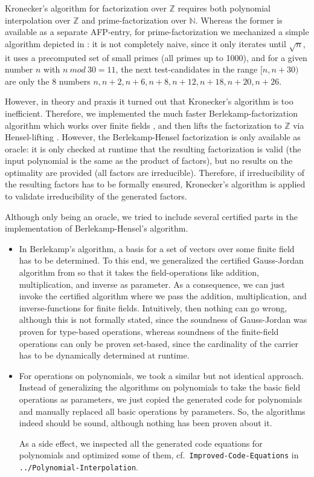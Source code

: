 \documentclass[11pt,a4paper]{article}
\newcommand\ints{\mathbb{Z}}
\newcommand\nats{\mathbb{N}}
\newcommand\mod{\mathit{mod}}
\begin{document}
Kronecker's algorithm for factorization over $\ints$ requires both
polynomial interpolation over $\ints$ and prime-factorization over $\nats$. Whereas the former
is available as a separate AFP-entry, for prime-factorization we mechanized a simple algorithm depicted
in \cite{Knuth}: it is not completely naive, since it only iterates until $\sqrt n$, it uses
a precomputed set of small primes (all primes up to 1000), 
and for a given number $n$ with $n\ \mod\ 30 = 11$, 
the next test-candidates in the range $[n,n+30)$ 
are only the 8 numbers $n,n+2,n+6,n+8,n+12,n+18,n+20,n+26$.

However, in theory and praxis it turned out that Kronecker's algorithm is too inefficient. 
Therefore, we implemented the much faster Berlekamp-factorization algorithm which works over finite fields \cite{Berlekamp}, and
then lifts the factorization to $\ints$ via Hensel-lifting \cite{Hensel}. However, the Berlekamp-Hensel
factorization is only available as oracle: it is only checked at runtime that the resulting
factorization is valid (the input polynomial is the same as the product of factors), 
but no results on the optimality are provided (all factors are irreducible). 
Therefore, if irreducibility of the resulting factors has to be formally ensured, 
Kronecker's algorithm is applied to validate irreducibility of the generated factors.

Although only being an oracle, we tried to include several certified parts in the implementation
of Berlekamp-Hensel's algorithm.
\begin{itemize}
\item In Berlekamp's algorithm, a basis for a set of vectors over some finite field has to be determined.
  To this end, we generalized the certified Gauss-Jordan algorithm from \cite{JNF-AFP} so that 
  it takes the field-operations like addition, multiplication, and inverse as parameter. 
  As a consequence, we can just invoke the certified algorithm 
  where we pass the addition, multiplication, and
  inverse-functions for finite fields. Intuitively, then nothing can go wrong, although this is not
  formally stated, since the soundness of Gauss-Jordan was proven for type-based operations, whereas
  soundness of the finite-field operations can only be proven set-based, since the cardinality of the
  carrier has to be dynamically determined at runtime.
\item For operations on polynomials, we took a similar but not identical approach. Instead of 
  generalizing the algorithms on polynomials to take the basic field operations as parameters, we just
  copied the generated code for polynomials and manually replaced all basic operations by parameters.
  So, the algorithms indeed should be sound, although nothing has been proven about it.
  
  As a side effect, we inspected all the generated code equations for polynomials and optimized some of them,
  cf.\ \texttt{Improved-Code-Equations} in \texttt{../Polynomial-Interpolation}.
\end{itemize}
\end{document}
